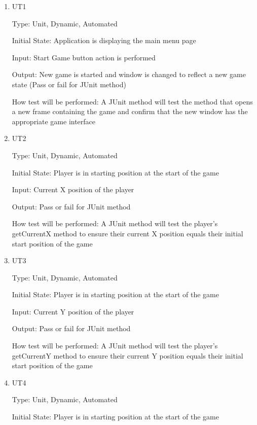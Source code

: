 \documentclass[12pt, titlepage]{article}
\begin{document}
\begin{enumerate}

\item{UT1\\}

Type: Unit, Dynamic, Automated
					
Initial State: Application is displaying the main menu page
					
Input: Start Game button action is performed
					
Output: New game is started and window is changed to reflect a new game state (Pass or fail for JUnit method)
					
How test will be performed: A JUnit method will test the method that opens a new frame containing the game and confirm that the new window has the appropriate game interface

\item{UT2\\}

Type: Unit, Dynamic, Automated
					
Initial State: Player is in starting position at the start of the game
					
Input: Current X position of the player
					
Output: Pass or fail for JUnit method
					
How test will be performed: A JUnit method will test the player's getCurrentX method to ensure their current X position equals their initial start position of the game

\item{UT3\\}

Type: Unit, Dynamic, Automated
					
Initial State: Player is in starting position at the start of the game
					
Input: Current Y position of the player
					
Output: Pass or fail for JUnit method
					
How test will be performed: A JUnit method will test the player's getCurrentY method to ensure their current Y position equals their initial start position of the game

\item{UT4\\}

Type: Unit, Dynamic, Automated
					
Initial State: Player is in starting position at the start of the game
					

\end{enumerate}
\end{document}
